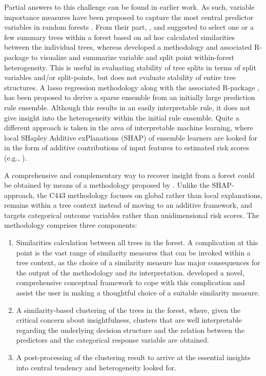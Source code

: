 Partial answers to this challenge can be found in earlier work. As such, variable importance measures have been proposed to capture the most central predictor variables in random forests \citep{Breiman2001, Breiman2003}. From their part, \citet{Banerjee2012, Briand2009}, and \citet{Chipman1998} suggested to select one or a few summary trees within a forest based on ad hoc calculated similarities between the individual trees, whereas \citet{philipp2016} developed a methodology and associated R-package  to visualize and summarize variable and split point within-forest heterogeneity. This is useful in evaluating stability of tree splits in terms of split variables and/or split-points, but does not evaluate stability of entire tree structures. A lasso regression methodology \citep{Friedman2008} along with the associated R-package  \citep{Fokkema2020}, has been proposed to derive a sparse ensemble from an initially large prediction rule ensemble. Although this results in an easily interpretable rule, it does not give insight into the heterogeneity within the initial rule ensemble. Quite a different approach is taken in the area of interpretable machine learning, where local SHapley Additive exPlanations (SHAP) of ensemble learners are looked for in the form of additive contributions of input features to estimated risk scores (e.g., \citet{Lundberg2020}).

A comprehensive and complementary way to recover insight from a forest could be obtained by means of a methodology proposed by \citet{Sies2020}. Unlike the SHAP-approach, the C443 methodology focuses on global rather than local explanations, remains within a tree context instead of moving to an additive framework, and targets categorical outcome variables rather than unidimensional risk scores. The methodology comprises three components:
\begin{enumerate}
\item{Similarities calculation between all trees in the forest. A complication at this point is the vast range of similarity measures that can be invoked within a tree context, as the choice of a similarity measure has major consequences for the output of the methodology and its interpretation. \citet{Sies2020} developed a novel, comprehensive conceptual framework to cope with this complication and assist the user in making a thoughtful choice of a suitable similarity measure.}
\item{A similarity-based clustering of the trees in the forest, where, given the critical concern about insightfulness, clusters that are well interpretable regarding the underlying decision structure and the relation between the predictors and the categorical response variable are obtained.}
\item{A post-processing of the clustering result to arrive at the essential insights into central tendency and heterogeneity looked for.}
\end{enumerate}

